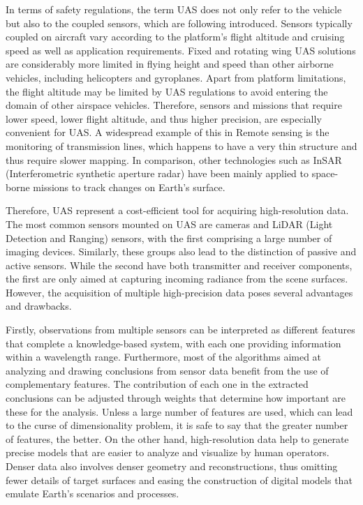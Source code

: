 In terms of safety regulations, the term UAS does not only refer to the vehicle but also to the coupled sensors, which are following introduced. Sensors typically coupled on aircraft vary according to the platform's flight altitude and cruising speed as well as application requirements. Fixed and rotating wing UAS solutions are considerably more limited in flying height and speed than other airborne vehicles, including helicopters and gyroplanes. Apart from platform limitations, the flight altitude may be limited by UAS regulations to avoid entering the domain of other airspace vehicles. Therefore, sensors and missions that require lower speed, lower flight altitude, and thus higher precision, are especially convenient for UAS. A widespread example of this in \gls{Remote sensing} is the monitoring of transmission lines, which happens to have a very thin structure and thus require slower mapping. In comparison, other technologies such as InSAR (Interferometric synthetic aperture radar) have been mainly applied to space-borne missions to track changes on Earth's surface.

Therefore, UAS represent a cost-efficient tool for acquiring high-resolution data. The most common sensors mounted on UAS are cameras and LiDAR (Light Detection and Ranging) sensors, with the first comprising a large number of imaging devices. Similarly, these groups also lead to the distinction of passive and active sensors. While the second have both transmitter and receiver components, the first are only aimed at capturing incoming radiance from the scene surfaces. However, the acquisition of multiple high-precision data poses several advantages and drawbacks. 

Firstly, observations from multiple sensors can be interpreted as different features that complete a knowledge-based system, with each one providing information within a wavelength range. Furthermore, most of the algorithms aimed at analyzing and drawing conclusions from sensor data benefit from the use of complementary features. The contribution of each one in the extracted conclusions can be adjusted through weights that determine how important are these for the analysis. Unless a large number of features are used, which can lead to the curse of dimensionality problem, it is safe to say that the greater number of features, the better. On the other hand, high-resolution data help to generate precise models that are easier to analyze and visualize by human operators. Denser data also involves denser geometry and reconstructions, thus omitting fewer details of target surfaces and easing the construction of digital models that emulate Earth's scenarios and processes. 

